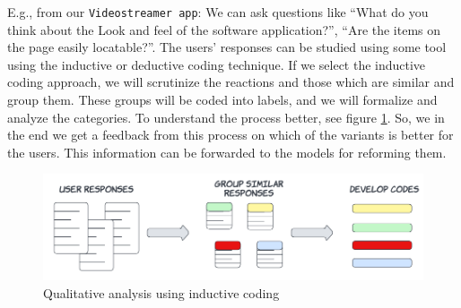 E.g., from our \texttt{Videostreamer app}: We can ask questions like ``What do you think about the Look and feel of the software application?'', ``Are the items on the page easily locatable?''.
The users' responses can be studied using some tool using the inductive or deductive coding technique. 
If we select the inductive coding approach, we will scrutinize the reactions and those which are similar and group them. 
These groups will be coded into labels, and we will formalize and analyze the categories. 
To understand the process better, see figure \ref{solutionideas:fig:qualitative}. So, we in the end we get a feedback from this process on which of the variants is better for the users. This information can be forwarded to the models for reforming them.
\begin{figure}[ht]
	\centering
  \includegraphics[width=1\textwidth]{images/solution-ideas/qualitative.png}
	\caption{Qualitative analysis using inductive coding}
	\label{solutionideas:fig:qualitative}
\end{figure}